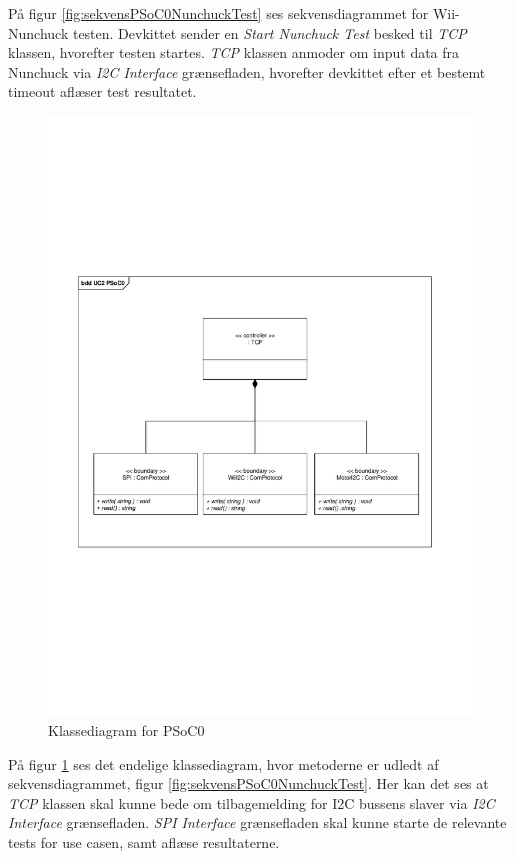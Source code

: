 På figur \ref{fig:sekvensPSoC0NunchuckTest} ses sekvensdiagrammet for Wii-Nunchuck testen. Devkittet sender en \textit{Start Nunchuck Test} besked til \textit{TCP} klassen, hvorefter testen startes. \textit{TCP} klassen anmoder om input data fra Nunchuck via \textit{I2C Interface} grænsefladen, hvorefter devkittet efter et bestemt timeout aflæser test resultatet.

\begin{figure}[H]
	\centering
	\includegraphics[width=\textwidth]{Systemarkitektur/images/klassediagramPSoC0}
	\caption{Klassediagram for PSoC0}
	\label{fig:klassePSoC0}
\end{figure}

På figur \ref{fig:klassePSoC0} ses det endelige klassediagram, hvor metoderne er udledt af sekvensdiagrammet, figur \ref{fig:sekvensPSoC0NunchuckTest}. Her kan det ses at \textit{TCP} klassen skal kunne bede om tilbagemelding for I2C bussens slaver via \textit{I2C Interface} grænsefladen. \textit{SPI Interface} grænsefladen skal kunne starte de relevante tests for use casen, samt aflæse resultaterne.

